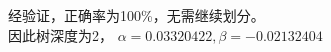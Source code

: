 \documentclass[answers]{exam}  %
\begin{document}
\begin{questions}
\begin{solution}
        经验证，正确率为100\%，无需继续划分。\\
        因此树深度为2， $\alpha=0.03320422 ,\beta=-0.02132404$
	\end{solution}

\end{questions}
\end{document}
